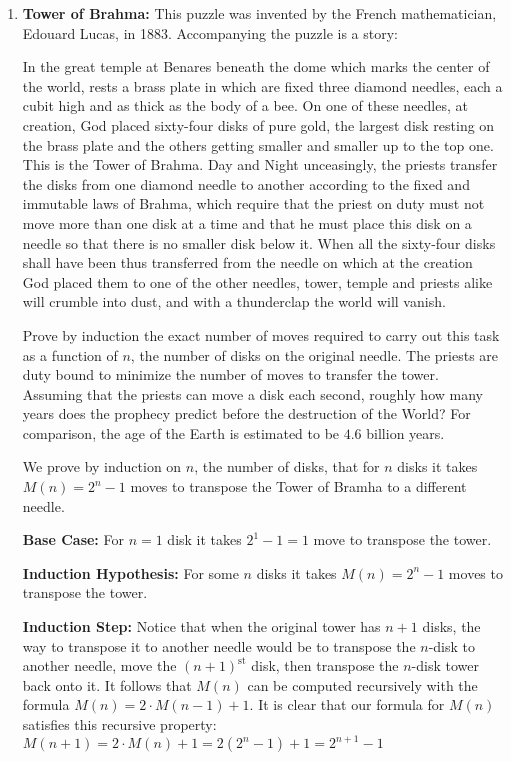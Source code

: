 \documentclass[11pt,fleqn]{article}
\begin{document}
\begin{enumerate}
\newpage
\item {\bf Tower of Brahma:} This puzzle was invented by the French mathematician, Edouard Lucas, in 1883. Accompanying the puzzle is a story:

In the great temple at Benares beneath the dome which marks the center of the world, rests a brass plate in which are fixed three diamond needles, each a cubit high and as thick as the body of a bee. On one of these needles, at creation, God placed sixty-four disks of pure gold, the largest disk resting on the brass plate and the others getting smaller and smaller up to the top one. This is the Tower of Brahma. Day and Night unceasingly, the priests transfer the disks from one diamond needle to another according to the fixed and immutable laws of Brahma, which require that the priest on duty must not move more than one disk at a time and that he must place this disk on a needle so that there is no smaller disk below it. When all the sixty-four disks shall have been thus transferred from the needle on which at the creation God placed them to one of the other needles, tower, temple and priests alike will crumble into dust, and with a thunderclap the world will vanish.

Prove by induction the exact number of moves required to carry out this task as a function of $n$, the number of disks on the original needle. The priests are duty bound to minimize the number of moves to transfer the tower. Assuming that the priests can move a disk each second, roughly how many years does the prophecy predict before the destruction of the World? For comparison, the age of the Earth is estimated to be $4.6$ billion years. 

We prove by induction on $n$, the number of disks, that for $n$ disks it takes $M(n) = 2^n - 1$ moves to transpose the Tower of Bramha to a different needle.

{\bf Base Case:} For $n=1$ disk it takes $2^1 - 1 = 1$ move to transpose the tower.

{\bf Induction Hypothesis:} For some $n$ disks it takes $M(n) = 2^n - 1$ moves to transpose the tower.

{\bf Induction Step:} Notice that when the original tower has $n+1$ disks, the way to transpose it to another needle would be to transpose the
    $n$-disk to another needle, move the $(n+1)^{\text{st}}$ disk, then transpose the $n$-disk tower back onto it. It follows that $M(n)$ can
    be computed recursively with the formula $M(n) = 2 \cdot M(n-1) + 1$. It is clear that our formula for $M(n)$ satisfies this recursive
    property: $M(n+1) = 2 \cdot M(n) + 1 = 2(2^n - 1) + 1 = 2^{n+1} - 1$

\end{enumerate}
\end{document}
